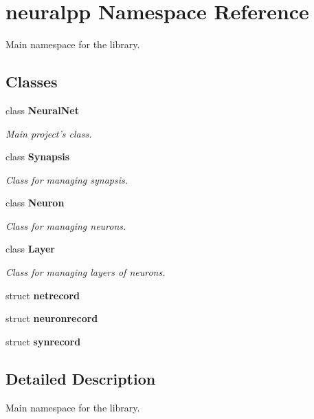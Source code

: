 \section{neuralpp Namespace Reference}
\label{namespaceneuralpp}
Main namespace for the library.  


\subsection*{Classes}
\begin{CompactItemize}
\item 
class {\bf NeuralNet}
\begin{CompactList}\small\item\em Main project's class. \item\end{CompactList}\item 
class {\bf Synapsis}
\begin{CompactList}\small\item\em Class for managing synapsis. \item\end{CompactList}\item 
class {\bf Neuron}
\begin{CompactList}\small\item\em Class for managing neurons. \item\end{CompactList}\item 
class {\bf Layer}
\begin{CompactList}\small\item\em Class for managing layers of neurons. \item\end{CompactList}\item 
struct {\bf netrecord}
\item 
struct {\bf neuronrecord}
\item 
struct {\bf synrecord}
\end{CompactItemize}


\subsection{Detailed Description}
Main namespace for the library. 